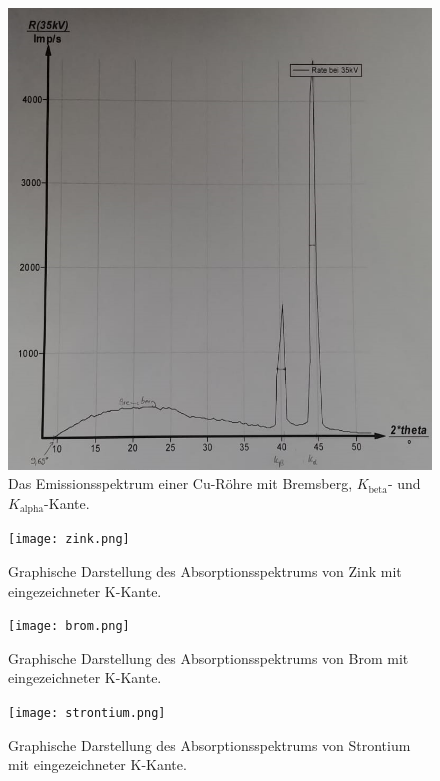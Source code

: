 \begin{figure}[H]
  \centering
  \includegraphics[width=\textwidth]{emission.png}
  \caption{Das Emissionsspektrum einer Cu-Röhre mit Bremsberg, $K_\text{beta}$- und $K_\text{alpha}$-Kante.}
  \label{fig:plot}
\end{figure}

\begin{figure}[H]
  \centering
  \texttt{[image: zink.png]}
  \caption{Graphische Darstellung des Absorptionsspektrums von Zink mit eingezeichneter K-Kante.}
  \label{fig:plot}
\end{figure}

\begin{figure}[H]
  \centering
  \texttt{[image: brom.png]}
  \caption{Graphische Darstellung des Absorptionsspektrums von Brom mit eingezeichneter K-Kante.}
  \label{fig:plot}
\end{figure}

\begin{figure}[H]
  \centering
  \texttt{[image: strontium.png]}
  \caption{Graphische Darstellung des Absorptionsspektrums von Strontium mit eingezeichneter K-Kante.}
  \label{fig:plot}
\end{figure}

